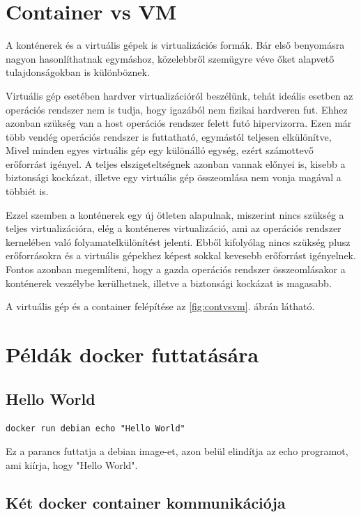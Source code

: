 \documentclass[]{article}
\numberwithin{equation}{section}
\begin{document}
\newpage

\section{Container vs VM}


A konténerek és a virtuális gépek is virtualizációs formák. Bár első benyomásra nagyon hasonlíthatnak egymáshoz, közelebbről szemügyre véve őket alapvető tulajdonságokban is különböznek. 

Virtuális gép esetében hardver virtualizációról beszélünk, tehát ideális esetben az operációs rendszer nem is tudja, hogy igazából nem fizikai hardveren fut. Ehhez azonban szükség van a host operációs rendszer felett futó hipervizorra. Ezen már több vendég operációs rendszer is futtatható, egymástól teljesen elkülönítve, Mivel minden egyes virtuális gép egy különálló egység, ezért számottevő erőforrást igényel. A teljes elszigeteltségnek azonban vannak előnyei is, kisebb a biztonsági kockázat, illetve egy virtuális gép összeomlása nem vonja magával a többiét is.

Ezzel szemben a konténerek egy új ötleten alapulnak, miszerint nincs szükség a teljes virtualizációra, elég a konténeres virtualizáció, ami az operációs rendszer kernelében való  folyamatelkülönítést jelenti. Ebből kifolyólag nincs szükség plusz erőforrásokra és a virtuális gépekhez képest sokkal kevesebb erőforrást igényelnek. Fontos azonban megemlíteni, hogy a gazda operációs rendszer összeomlásakor a konténerek veszélybe kerülhetnek, illetve a biztonsági kockázat is magasabb.

A virtuális gép és a container felépítése az \ref{fig:contvsvm}. ábrán látható.



\section{Példák docker futtatására}

\subsection{Hello World}

\texttt{docker run debian echo "Hello World"}

Ez a parancs futtatja a debian image-et, azon belül elindítja az echo programot, ami kiírja, hogy "Hello World".

\subsection{Két docker container kommunikációja}
\end{document}
